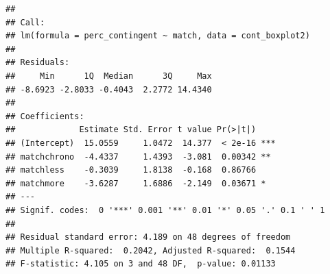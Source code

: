 \documentclass[
]{article}
\newenvironment{Shaded}{\begin{snugshade}}{\end{snugshade}}
\newcommand{\AttributeTok}[1]{\textcolor[rgb]{0.77,0.63,0.00}{#1}}
\newcommand{\CommentTok}[1]{\textcolor[rgb]{0.56,0.35,0.01}{\textit{#1}}}
\newcommand{\FunctionTok}[1]{\textcolor[rgb]{0.00,0.00,0.00}{#1}}
\newcommand{\NormalTok}[1]{#1}
\newcommand{\OtherTok}[1]{\textcolor[rgb]{0.56,0.35,0.01}{#1}}
\newcommand{\SpecialCharTok}[1]{\textcolor[rgb]{0.00,0.00,0.00}{#1}}
\newcommand{\StringTok}[1]{\textcolor[rgb]{0.31,0.60,0.02}{#1}}
\begin{document}
\begin{Shaded}
\end{Shaded}

\begin{verbatim}
## 
## Call:
## lm(formula = perc_contingent ~ match, data = cont_boxplot2)
## 
## Residuals:
##     Min      1Q  Median      3Q     Max 
## -8.6923 -2.8033 -0.4043  2.2772 14.4340 
## 
## Coefficients:
##             Estimate Std. Error t value Pr(>|t|)    
## (Intercept)  15.0559     1.0472  14.377  < 2e-16 ***
## matchchrono  -4.4337     1.4393  -3.081  0.00342 ** 
## matchless    -0.3039     1.8138  -0.168  0.86766    
## matchmore    -3.6287     1.6886  -2.149  0.03671 *  
## ---
## Signif. codes:  0 '***' 0.001 '**' 0.01 '*' 0.05 '.' 0.1 ' ' 1
## 
## Residual standard error: 4.189 on 48 degrees of freedom
## Multiple R-squared:  0.2042, Adjusted R-squared:  0.1544 
## F-statistic: 4.105 on 3 and 48 DF,  p-value: 0.01133
\end{verbatim}
\end{document}
